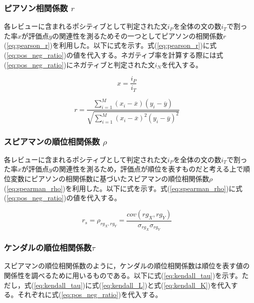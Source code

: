 \documentclass[review]{elsarticle}
\begin{document}
\begin{CJK}{UTF8}{min}
\subsubsection{ピアソン相関係数 \(r\)}\label{correl_pearson}

各レビューに含まれるポシティブとして判定された文\(i_P\)を全体の文の数\(i_T\)で割った率\(x\)が評価点\(y\)の関連性を測るためその一つとしてピアソンの相関係数\(r\)(\ref{eq:pearson_r})を利用した。以下に式を示す。式(\ref{eq:pearson_r})に式(\ref{eq:pos_neg_ratio})の値を代入する。ネガティブ率を計算する際には式(\ref{eq:pos_neg_ratio})にネガティブと判定された文\(i_N\)を代入する。

\begin{equation}\label{eq:pos_neg_ratio}
x = \frac{i_P}{i_T}
\end{equation}

\begin{equation}\label{eq:pearson_r}
r = \frac{{}\sum_{i=1}^{M} (x_i - \overline{x})(y_i - \overline{y})}
{\sqrt{\sum_{i=1}^{M} (x_i - \overline{x})^2(y_i - \overline{y})^2}}
\end{equation}

\subsubsection{スピアマンの順位相関係数 \(\rho\)}\label{correl_spearman}

各レビューに含まれるポシティブとして判定された文\(i_P\)を全体の文の数\(i_T\)で割った率\(x\)が評価点\(y\)の関連性を測るため，評価点が順位を表すものだと考える上で順位変数にピアソンの相関係数に基づいたスピアマンの順位相関係数\(\rho\)(\ref{eq:spearman_rho})を利用した。以下に式を示す。式(\ref{eq:spearman_rho})に式(\ref{eq:pos_neg_ratio})の値を代入する。

\begin{equation}\label{eq:spearman_rho}
r_s = \rho_{rg_X,rg_Y} = \frac{cov(rg_X,rg_Y)}{\sigma_{rg_X} \sigma_{rg_Y}}
\end{equation}

\subsubsection{ケンダルの順位相関係数\(\tau\)}\label{correl_kendall}

スピアマンの順位相関係数のように，ケンダルの順位相関係数は順位を表す値の関係性を調べるために用いるものである。以下に式(\ref{eq:kendall_tau})を示す。ただし，式(\ref{eq:kendall_tau})に式(\ref{eq:kendall_L})と式(\ref{eq:kendall_K})を代入する。それぞれに式(\ref{eq:pos_neg_ratio})を代入する。



\end{CJK}
\end{document}
